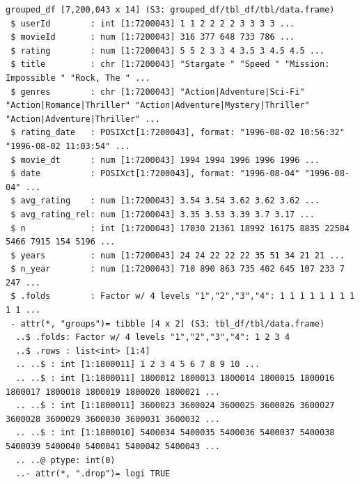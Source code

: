 \documentclass[
]{article}
\begin{document}
\begin{verbatim}
grouped_df [7,200,043 x 14] (S3: grouped_df/tbl_df/tbl/data.frame)
 $ userId        : int [1:7200043] 1 1 2 2 2 2 3 3 3 3 ...
 $ movieId       : num [1:7200043] 316 377 648 733 786 ...
 $ rating        : num [1:7200043] 5 5 2 3 3 4 3.5 3 4.5 4.5 ...
 $ title         : chr [1:7200043] "Stargate " "Speed " "Mission: Impossible " "Rock, The " ...
 $ genres        : chr [1:7200043] "Action|Adventure|Sci-Fi" "Action|Romance|Thriller" "Action|Adventure|Mystery|Thriller" "Action|Adventure|Thriller" ...
 $ rating_date   : POSIXct[1:7200043], format: "1996-08-02 10:56:32" "1996-08-02 11:03:54" ...
 $ movie_dt      : num [1:7200043] 1994 1994 1996 1996 1996 ...
 $ date          : POSIXct[1:7200043], format: "1996-08-04" "1996-08-04" ...
 $ avg_rating    : num [1:7200043] 3.54 3.54 3.62 3.62 3.62 ...
 $ avg_rating_rel: num [1:7200043] 3.35 3.53 3.39 3.7 3.17 ...
 $ n             : int [1:7200043] 17030 21361 18992 16175 8835 22584 5466 7915 154 5196 ...
 $ years         : num [1:7200043] 24 24 22 22 22 35 51 34 21 21 ...
 $ n_year        : num [1:7200043] 710 890 863 735 402 645 107 233 7 247 ...
 $ .folds        : Factor w/ 4 levels "1","2","3","4": 1 1 1 1 1 1 1 1 1 1 ...
 - attr(*, "groups")= tibble [4 x 2] (S3: tbl_df/tbl/data.frame)
  ..$ .folds: Factor w/ 4 levels "1","2","3","4": 1 2 3 4
  ..$ .rows : list<int> [1:4] 
  .. ..$ : int [1:1800011] 1 2 3 4 5 6 7 8 9 10 ...
  .. ..$ : int [1:1800011] 1800012 1800013 1800014 1800015 1800016 1800017 1800018 1800019 1800020 1800021 ...
  .. ..$ : int [1:1800011] 3600023 3600024 3600025 3600026 3600027 3600028 3600029 3600030 3600031 3600032 ...
  .. ..$ : int [1:1800010] 5400034 5400035 5400036 5400037 5400038 5400039 5400040 5400041 5400042 5400043 ...
  .. ..@ ptype: int(0) 
  ..- attr(*, ".drop")= logi TRUE
\end{verbatim}
\end{document}
